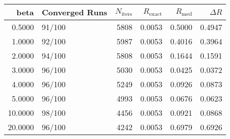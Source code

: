 \begin{tabular}{rlrrrr}
\toprule
beta & Converged Runs & $N_{\text{iters}}$ & $R_{\text{exact}}$ & $R_{\text{med}}$ & $\Delta R$ \\
\midrule
0.5000 & 91/100 & 5808 & 0.0053 & 0.5000 & 0.4947 \\
1.0000 & 92/100 & 5987 & 0.0053 & 0.4016 & 0.3964 \\
2.0000 & 94/100 & 5808 & 0.0053 & 0.1644 & 0.1591 \\
3.0000 & 96/100 & 5030 & 0.0053 & 0.0425 & 0.0372 \\
4.0000 & 96/100 & 5249 & 0.0053 & 0.0926 & 0.0873 \\
5.0000 & 96/100 & 4993 & 0.0053 & 0.0676 & 0.0623 \\
10.0000 & 98/100 & 4456 & 0.0053 & 0.0921 & 0.0868 \\
20.0000 & 96/100 & 4242 & 0.0053 & 0.6979 & 0.6926 \\
\bottomrule
\end{tabular}
